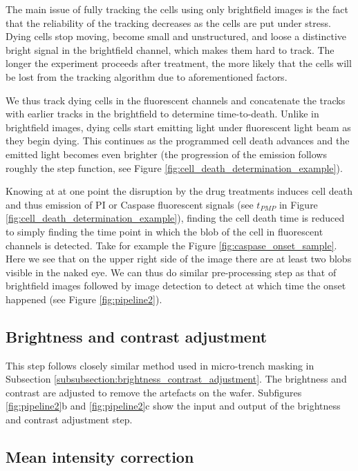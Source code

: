 \documentclass[pdftex,12pt,a4paper]{report}
\begin{document}

The main issue of fully tracking the cells using only brightfield images is the fact that the reliability of the tracking decreases as the cells are put under stress. Dying cells stop moving, become small and unstructured, and loose a distinctive bright signal in the brightfield channel, which makes them hard to track. The longer the experiment proceeds after treatment, the more likely that the cells will be lost from the tracking algorithm due to aforementioned factors.

We thus track dying cells in the fluorescent channels and concatenate the tracks with earlier tracks in the brightfield to determine time-to-death. Unlike in brightfield images, dying cells start emitting light under fluorescent light beam as they begin dying. This continues as the programmed cell death advances and the emitted light becomes even brighter (the progression of the emission follows roughly the step function, see Figure \ref{fig:cell_death_determination_example}).

Knowing at at one point the disruption by the drug treatments induces cell death and thus emission of PI or Caspase fluorescent signals (see $t_{PMP}$ in Figure \ref{fig:cell_death_determination_example}), finding the cell death time is reduced to simply finding the time point in which the blob of the cell in fluorescent channels is detected. Take for example the Figure \ref{fig:caspase_onset_sample}. Here we see that on the upper right side of the image there are at least two blobs visible in the naked eye. We can thus do similar pre-processing step as that of brightfield images followed by image detection to detect at which time the onset happened (see Figure \ref{fig:pipeline2}).

\subsection{Brightness and contrast adjustment}

This step follows closely similar method used in micro-trench masking in Subsection \ref{subsubsection:brightness_contrast_adjustment}. The brightness and contrast are adjusted to remove the artefacts on the wafer. Subfigures \ref{fig:pipeline2}b and \ref{fig:pipeline2}c show the input and output of the brightness and contrast adjustment step.

\subsection{Mean intensity correction}
\end{document}
